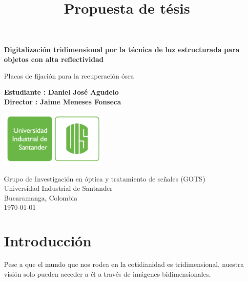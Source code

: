 \documentclass[UTF8]{article}
\title{Propuesta de tésis}
\begin{document}
\begin{titlepage}
   \begin{center}
       \vspace*{1cm}
       \LARGE
       \textbf{Digitalización tridimensional por la técnica de luz estructurada para objetos con alta reflectividad}
 
       \vspace{0.5cm}
       
       \LARGE
        Placas de fijación para la recuperación ósea
 
       \vspace{1.5cm}
       \large
       \textbf{Estudiante : Daniel José Agudelo\\
       Director : Jaime Meneses Fonseca}
 
       \vfill
 
 
 
     
 
       \includegraphics[width=0.4\textwidth]{Logo.png}
 
       Grupo de Investigación en óptica y tratamiento de señales (GOTS)\\
       Universidad Industrial de Santander\\
       Bucaramanga, Colombia\\
       \today
 
   \end{center}
\end{titlepage}



\newpage
\begin{abstract}
\end{abstract}
\medskip

\section{Introducción}

Pese a que el mundo que nos rodea en la cotidianidad es tridimensional, nuestra visión solo pueden acceder a él a través de imágenes bidimensionales. %
\end{document}
